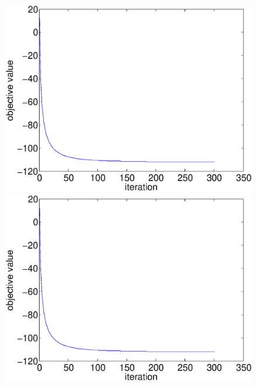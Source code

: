 \documentclass{scrartcl}
\begin{document}
\begin{figure}[H]
  \begin{minipage}[b]{0.3\textwidth}
    \centering
    \includegraphics[scale=0.26]{prob_28_obj_k_10.eps}
  \end{minipage}
  \quad
  \begin{minipage}[b]{0.3\textwidth}
    \centering
    \includegraphics[scale=0.26]{prob_28_obj_k_100.eps}
  \end{minipage}
  \quad
  \begin{minipage}[b]{0.3\textwidth}
    \centering

\end{minipage}
\end{figure}
\end{document}
